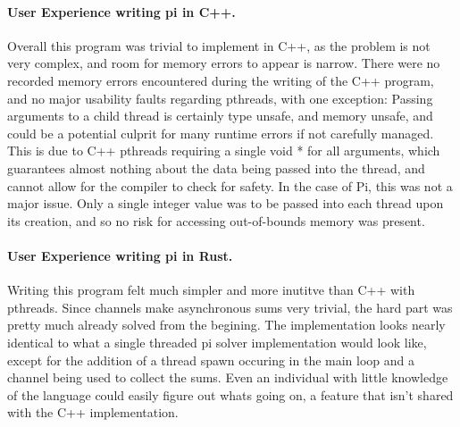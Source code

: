 \paragraph{User Experience writing pi in C++.}
Overall this program was trivial to implement in C++, as the problem is not very
complex, and room for memory errors to appear is narrow. There were no recorded
memory errors encountered during the writing of the C++ program, and no major
usability faults regarding pthreads, with one exception: Passing arguments to
a child thread is certainly type unsafe, and memory unsafe, and could be
a potential culprit for many runtime errors if not carefully managed. This is
due to C++ pthreads requiring a single {\cf void *} for all arguments, which
guarantees almost nothing about the data being passed into the thread, and
cannot allow for the compiler to check for safety. In the case of Pi, this was
not a major issue. Only a single integer value was to be passed into each
thread upon its creation, and so no risk for accessing out-of-bounds memory was
present.

\paragraph{User Experience writing pi in Rust.}
Writing this program felt much simpler and more inutitve than C++ with pthreads.
Since channels make asynchronous sums very trivial, the hard part was pretty
much already solved from the begining. The implementation looks nearly identical
to what a single threaded pi solver implementation would look like, except for
the addition of a thread spawn occuring in the main loop and a channel being
used to collect the sums. Even an individual with little knowledge of the
language could easily figure out whats going on, a feature that isn't shared
with the C++ implementation.
